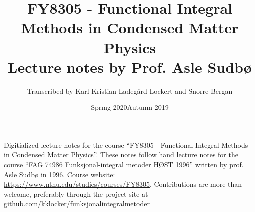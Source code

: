 \documentclass{article}
\title{FY8305 - Functional Integral Methods in Condensed Matter Physics \\
	Lecture notes by Prof. Asle Sudbø
}
\date{Spring 2020}
\author{Transcribed by Karl Kristian Ladegård Lockert and Snorre Bergan}
\date{Autumn 2019}
\theoremstyle{definition}
\newcommand{\contribs}{%
\begin{center}
\large 
\textbf{Contributors to the digitalization of the lecture notes}
\end{center}
\begin{itemize}
\item Karl Kristian Ladegård Lockert
\item Snorre Bergan
\end{itemize}

}
\begin{document}
\maketitle
\newpage
Digitialized lecture notes for the course ``FY8305 - Functional Integral Methods in Condensed Matter Physics''.
These notes follow hand lecture notes for the course ``FAG 74986 Funksjonal-integral metoder HØST 1996'' written by prof. Asle Sudbø in 1996.
Course website: \href{https://www.ntnu.edu/studies/courses/FY8305}{\color{blue!80!white}https://www.ntnu.edu/studies/courses/FY8305}. Contributions are more than welcome, preferably through the project site at \href{https://github.com/kklocker/funksjonalintegralmetoder}{\color{blue!80!white}github.com/kklocker/funksjonalintegralmetoder}
\tableofcontents








%
%







%




\end{document}
